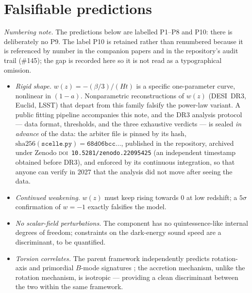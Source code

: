 \documentclass[11pt]{article}
\begin{document}
\section{Falsifiable predictions}
\emph{Numbering note.} The predictions below are labelled P1--P8 and P10: there is deliberately no P9. The label P10 is retained rather than renumbered because it is referenced by number in the companion papers and in the repository's audit trail (\#145); the gap is recorded here so it is not read as a typographical omission.
\begin{itemize}
\item[P1.] \emph{Rigid shape.} $w(z) = -(\beta/3)/(Ht)$ is a specific one-parameter curve, nonlinear in $(1-a)$. Nonparametric reconstructions of $w(z)$ (DESI~DR3, Euclid, LSST) that depart from this family falsify the power-law variant. A public fitting pipeline accompanies this note, and the DR3 analysis protocol --- data format, thresholds, and the three exhaustive verdicts --- is sealed \emph{in advance} of the data: the arbiter file is pinned by its hash, $\mathrm{sha256}(\texttt{scelle.py}) = \texttt{68d06bcc}\ldots$, published in the repository, archived under Zenodo \textsc{doi}~\texttt{10.5281/zenodo.22095425} (an independent timestamp obtained before DR3), and enforced by its continuous integration, so that anyone can verify in 2027 that the analysis did not move after seeing the data.
\item[P2.] \emph{Continued weakening.} $w(z)$ must keep rising towards $0$ at low redshift; a $5\sigma$ confirmation of $w = -1$ exactly falsifies the model.
\item[P3.] \emph{No scalar-field perturbations.} The component has no quintessence-like internal degrees of freedom; constraints on the dark-energy sound speed are a discriminant, to be quantified.
\item[P4.] \emph{Torsion correlates.} The parent framework independently predicts rotation-axis and primordial $B$-mode signatures \cite{Poplawski2025}; the accretion mechanism, unlike the rotation mechanism, is isotropic --- providing a clean discriminant between the two within the same framework.

\end{itemize}
\end{document}
